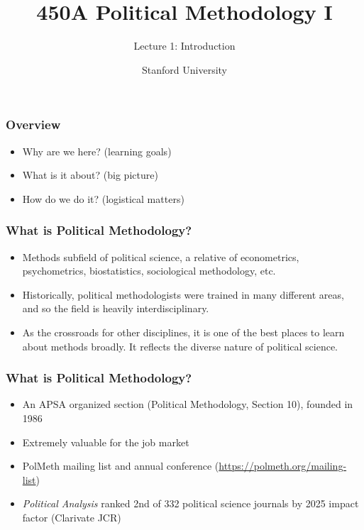 \documentclass[xcolor=svgnames,9pt,english,aspectratio=169,t]{beamer}
\title[Introduction]{450A Political Methodology I}
\subtitle{Lecture 1: Introduction}
\author{Stanford University}
\date{}
\begin{document}
\begin{frame}[plain,c]
  \titlepage
  \addtocounter{framenumber}{-1}
\end{frame}


\begin{frame}[t]
\frametitle{Overview}
\vspace{5ex}
\begin{itemize}\itemsep1em
	\item Why are we here? (learning goals)
	\item What is it about? (big picture)
	\item How do we do it? (logistical matters)
\end{itemize}
\end{frame}

\begin{frame}
  \frametitle{What is Political Methodology?}
\begin{itemize}\itemsep1em
\item Methods subfield of political science, a relative of econometrics,
psychometrics, biostatistics, sociological
methodology, etc. \pause
\item Historically, political methodologists were trained in many different
areas, and so the field is heavily interdisciplinary. \pause
\item As the crossroads for other disciplines, it is one of the best places to
learn about methods broadly. It reflects the diverse nature of political
science. 
\end{itemize}
\end{frame}

\begin{frame}
  \frametitle{What is Political Methodology?}
\begin{itemize}\itemsep1em
\item An APSA organized section (Political Methodology, Section 10), founded in 1986\pause
\item Extremely valuable for the job market \pause
\item PolMeth mailing list and annual conference (\href{https://polmeth.org/mailing-list}{https://polmeth.org/mailing-list})\pause
\item \emph{Political Analysis} ranked 2nd of 332 political science journals by 2025 impact factor (Clarivate JCR)
\end{itemize}
\end{frame}
\end{document}
